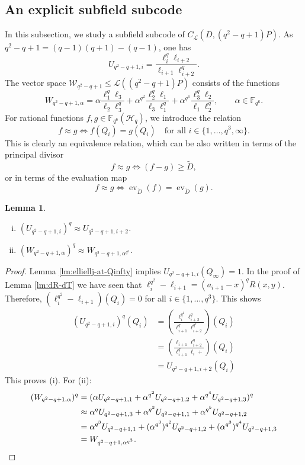 \documentclass[11pt]{amsart}
\theoremstyle{plain}
\newtheorem{lemma}[theorem]{Lemma}
\theoremstyle{definition}
\theoremstyle{remark}
\DeclareMathOperator{\ev}{ev}
\begin{document}
\subsection{An explicit subfield subcode}

In this subsection, we study a subfield subcode of $C_\mathcal{L}(D,(q^2-q+1)P)$. As $q^2-q+1=(q-1)(q+1)-(q-1)$, one has
\[U_{q^2-q+1,i} = \frac{\ell_i^q\ell_{i+2}}{\ell_{i+1}\ell_{i+2}^q}.\]
The vector space $\mathcal{W}_{q^2-q+1}\leq \mathscr{L}((q^2-q+1)P)$ consists of the functions
\[W_{q^2-q+1,\alpha} = \alpha \frac{\ell_1^q\ell_3}{\ell_2\ell_3^q} + \alpha^{q^2} \frac{\ell_2^q\ell_1}{\ell_3\ell_1^q} + \alpha^{q^4} \frac{\ell_3^q\ell_2}{\ell_1\ell_2^q}, \qquad \alpha \in \mathbb{F}_{q^6}.\]
For rational functions $f,g\in \mathbb{F}_{q^6}(\mathscr{H}_q)$, we introduce the relation
\[f\approx g \Longleftrightarrow f(Q_i)=g(Q_i) \quad \text{for all $i \in \{1,\ldots,q^3,\infty\}$.}\]
This is clearly an equivalence relation, which can be also written in terms of the principal divisor
\[f\approx g \Longleftrightarrow (f-g) \geq \widetilde{D},\]
or in terms of the evaluation map
\[f\approx g \Longleftrightarrow \ev_{\widetilde{D}}(f) = \ev_{\widetilde{D}}(g).\]

\begin{lemma} \label{lm:Uq-Wq}
\begin{enumerate}[(i)]
\item $(U_{q^2-q+1,i})^q \approx U_{q^2-q+1,i+2}$.
\item $(W_{q^2-q+1,\alpha})^q \approx W_{q^2-q+1,\alpha^{q^3}}$.
\end{enumerate}
\end{lemma}
\begin{proof}
Lemma \ref{lm:elliellj-at-Qinfty} implies $U_{q^2-q+1,i}(Q_\infty)=1$. In the proof of Lemma \ref{lm:dR-dT} we have seen that $\ell_i^{q^2} - \ell_{i+1}=(a_{i+1}-x)^qR(x,y)$. Therefore, $(\ell_i^{q^2} - \ell_{i+1})(Q_i)=0$ for all $i\in \{1,\ldots,q^3\}$. This shows 
\begin{align*}
(U_{q^2-q+1,i})^q(Q_i) &= \left(\frac{\ell_i^{q^2}\ell_{i+2}^q}{\ell_{i+1}^q\ell_{i+2}^{q^2}}\right)(Q_i)\\
&=\left(\frac{\ell_{i+1}\ell_{i+2}^q}{\ell_{i+1}^q\ell_{i}+}\right)(Q_i)\\
&=U_{q^2-q+1,i+2}(Q_i)
\end{align*}
This proves (i). For (ii):
\begin{align*}
(W_{q^2-q+1,\alpha})^q &= (\alpha U_{q^2-q+1,1} + \alpha^{q^2} U_{q^2-q+1,2} + \alpha^{q^4} U_{q^2-q+1,3})^q \\
&\approx \alpha^q U_{q^2-q+1,3} + \alpha^{q^3} U_{q^2-q+1,1} + \alpha^{q^5} U_{q^2-q+1,2} \\
&=\alpha^{q^3} U_{q^2-q+1,1} + (\alpha^{q^3})^{q^2} U_{q^2-q+1,2} + (\alpha^{q^3})^{q^4} U_{q^2-q+1,3} \\
&=W_{q^2-q+1,\alpha^{q^3}}. \qedhere
\end{align*}
\end{proof}
\end{document}
